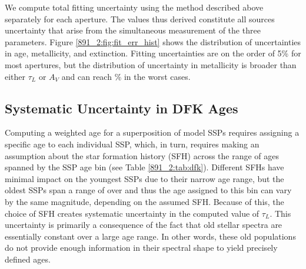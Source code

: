 

We compute total fitting uncertainty using the method described above
separately for each aperture. The values thus derived constitute all
sources uncertainty that arise from the simultaneous measurement of
the three parameters. Figure \ref{891_2:fig:fit_err_hist} shows the
distribution of uncertainties in age, metallicity, and
extinction. Fitting uncertainties are on the order of 5\% for most
apertures, but the distribution of uncertainty in metallicity is
broader than either $\tau_L$ or $A_V$ and can reach \% in the
worst cases.



\subsection{Systematic Uncertainty in DFK Ages}
\label{891_2:sec:sys_err}

Computing a weighted age for a superposition of model SSPs requires
assigning a specific age to each individual SSP, which, in turn,
requires making an assumption about the star formation history (SFH)
across the range of ages spanned by the SSP age bin (see Table
\ref{891_2:tab:dfk}). Different SFHs have minimal impact on the youngest
SSPs due to their narrow age range, but the oldest SSPs span a range
of over  and thus the age assigned to this bin can vary by
the same magnitude, depending on the assumed SFH. Because of this, the
choice of SFH creates systematic uncertainty in the computed value of
$\tau_L$. This uncertainty is primarily a consequence of the fact that
old stellar spectra are essentially constant over a large age
range. In other words, these old populations do not provide enough
information in their spectral shape to yield precisely defined ages.



